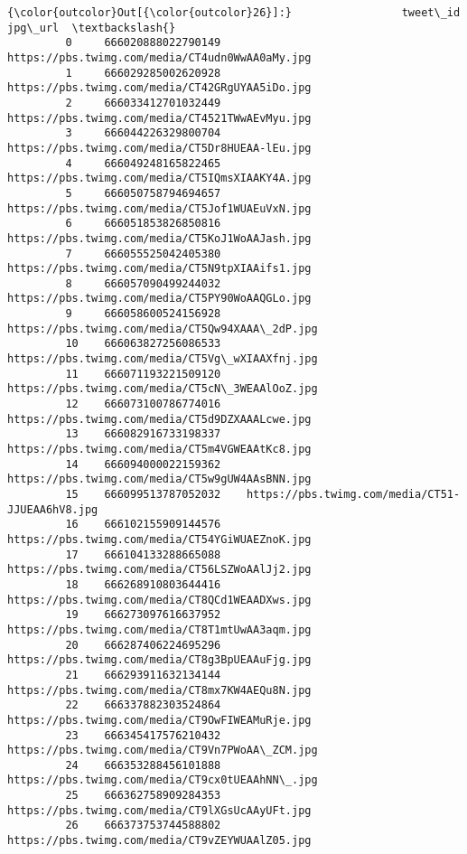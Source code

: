 \documentclass[11pt]{article}
\begin{document}
\begin{Verbatim}[commandchars=\\\{\}]
{\color{outcolor}Out[{\color{outcolor}26}]:}                 tweet\_id                                            jpg\_url  \textbackslash{}
         0     666020888022790149    https://pbs.twimg.com/media/CT4udn0WwAA0aMy.jpg   
         1     666029285002620928    https://pbs.twimg.com/media/CT42GRgUYAA5iDo.jpg   
         2     666033412701032449    https://pbs.twimg.com/media/CT4521TWwAEvMyu.jpg   
         3     666044226329800704    https://pbs.twimg.com/media/CT5Dr8HUEAA-lEu.jpg   
         4     666049248165822465    https://pbs.twimg.com/media/CT5IQmsXIAAKY4A.jpg   
         5     666050758794694657    https://pbs.twimg.com/media/CT5Jof1WUAEuVxN.jpg   
         6     666051853826850816    https://pbs.twimg.com/media/CT5KoJ1WoAAJash.jpg   
         7     666055525042405380    https://pbs.twimg.com/media/CT5N9tpXIAAifs1.jpg   
         8     666057090499244032    https://pbs.twimg.com/media/CT5PY90WoAAQGLo.jpg   
         9     666058600524156928    https://pbs.twimg.com/media/CT5Qw94XAAA\_2dP.jpg   
         10    666063827256086533    https://pbs.twimg.com/media/CT5Vg\_wXIAAXfnj.jpg   
         11    666071193221509120    https://pbs.twimg.com/media/CT5cN\_3WEAAlOoZ.jpg   
         12    666073100786774016    https://pbs.twimg.com/media/CT5d9DZXAAALcwe.jpg   
         13    666082916733198337    https://pbs.twimg.com/media/CT5m4VGWEAAtKc8.jpg   
         14    666094000022159362    https://pbs.twimg.com/media/CT5w9gUW4AAsBNN.jpg   
         15    666099513787052032    https://pbs.twimg.com/media/CT51-JJUEAA6hV8.jpg   
         16    666102155909144576    https://pbs.twimg.com/media/CT54YGiWUAEZnoK.jpg   
         17    666104133288665088    https://pbs.twimg.com/media/CT56LSZWoAAlJj2.jpg   
         18    666268910803644416    https://pbs.twimg.com/media/CT8QCd1WEAADXws.jpg   
         19    666273097616637952    https://pbs.twimg.com/media/CT8T1mtUwAA3aqm.jpg   
         20    666287406224695296    https://pbs.twimg.com/media/CT8g3BpUEAAuFjg.jpg   
         21    666293911632134144    https://pbs.twimg.com/media/CT8mx7KW4AEQu8N.jpg   
         22    666337882303524864    https://pbs.twimg.com/media/CT9OwFIWEAMuRje.jpg   
         23    666345417576210432    https://pbs.twimg.com/media/CT9Vn7PWoAA\_ZCM.jpg   
         24    666353288456101888    https://pbs.twimg.com/media/CT9cx0tUEAAhNN\_.jpg   
         25    666362758909284353    https://pbs.twimg.com/media/CT9lXGsUcAAyUFt.jpg   
         26    666373753744588802    https://pbs.twimg.com/media/CT9vZEYWUAAlZ05.jpg   

\end{Verbatim}
\end{document}

